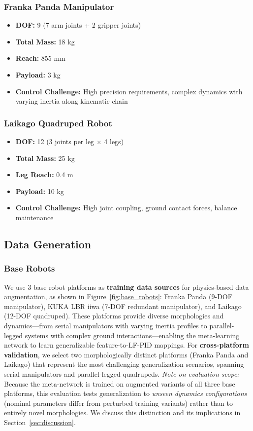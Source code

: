 \documentclass[DTMColor]{ROB-New}
\begin{document}
\subsubsection{Franka Panda Manipulator}
\begin{itemize}
    \item \textbf{DOF:} 9 (7 arm joints + 2 gripper joints)
    \item \textbf{Total Mass:} 18 kg
    \item \textbf{Reach:} 855 mm
    \item \textbf{Payload:} 3 kg
    \item \textbf{Control Challenge:} High precision requirements, complex dynamics with varying inertia along kinematic chain
\end{itemize}

\subsubsection{Laikago Quadruped Robot}
\begin{itemize}
    \item \textbf{DOF:} 12 (3 joints per leg $\times$ 4 legs)
    \item \textbf{Total Mass:} 25 kg
    \item \textbf{Leg Reach:} 0.4 m
    \item \textbf{Payload:} 10 kg
    \item \textbf{Control Challenge:} High joint coupling, ground contact forces, balance maintenance
\end{itemize}

\subsection{Data Generation}

\subsubsection{Base Robots}

We use 3 base robot platforms as \textbf{training data sources} for physics-based data augmentation, as shown in Figure~\ref{fig:base_robots}: Franka Panda (9-DOF manipulator), KUKA LBR iiwa (7-DOF redundant manipulator), and Laikago (12-DOF quadruped). These platforms provide diverse morphologies and dynamics—from serial manipulators with varying inertia profiles to parallel-legged systems with complex ground interactions—enabling the meta-learning network to learn generalizable feature-to-LF-PID mappings. For \textbf{cross-platform validation}, we select two morphologically distinct platforms (Franka Panda and Laikago) that represent the most challenging generalization scenarios, spanning serial manipulators and parallel-legged quadrupeds. {\color{blue}\textit{Note on evaluation scope:} Because the meta-network is trained on augmented variants of all three base platforms, this evaluation tests generalization to \textit{unseen dynamics configurations} (nominal parameters differ from perturbed training variants) rather than to entirely novel morphologies. We discuss this distinction and its implications in Section~\ref{sec:discussion}.}
\end{document}

